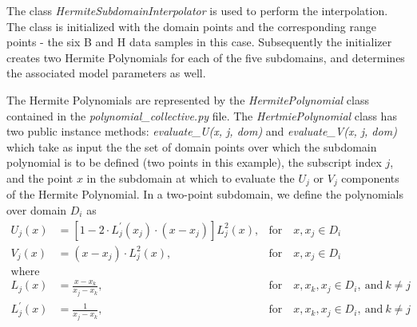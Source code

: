 \documentclass[11pt]{article}
\begin{document}
The class \textit{HermiteSubdomainInterpolator} is used to perform the interpolation. The class is initialized with the domain points and the corresponding range points - the six B and H data samples in this case. Subsequently the initializer creates two Hermite Polynomials for each of the five subdomains, and determines the associated model parameters as well.

The Hermite Polynomials are represented by the \textit{HermitePolynomial} class contained in the \textit{polynomial\_collective.py} file. The \textit{HertmiePolynomial} class has two public instance methods: \textit{evaluate\_U(x, j, dom)} and \textit{evaluate\_V(x, j, dom)} which take as input the the set of domain points over which the subdomain polynomial is to be defined (two points in this example), the subscript index $j$, and the point $x$ in the subdomain at which to evaluate the $U_j$ or $V_j$ components of the Hermite Polynomial. In a two-point subdomain, we define the polynomials over domain $D_i$ as
\begin{align*}
    U_j(x) &= [1 - 2 \cdot L^{\prime}_j(x_j) \cdot (x-x_j)]L^2_j(x), &\text{for} \quad x, x_j \in D_i\\
    V_j(x) &= (x-x_j) \cdot L^2_j(x), &\text{for} \quad x, x_j \in D_i\\
    \text{where}&\\
    L_j(x) &= \frac{x - x_k}{x_j - x_k}, &\text{for} \quad x, x_k, x_j \in D_i, \ \text{and}\ k \neq j\\
    L^{\prime}_j(x) &= \frac{1}{x_j - x_k}, &\text{for} \quad x, x_k, x_j \in D_i, \ \text{and}\ k \neq j
\end{align*}
\end{document}
